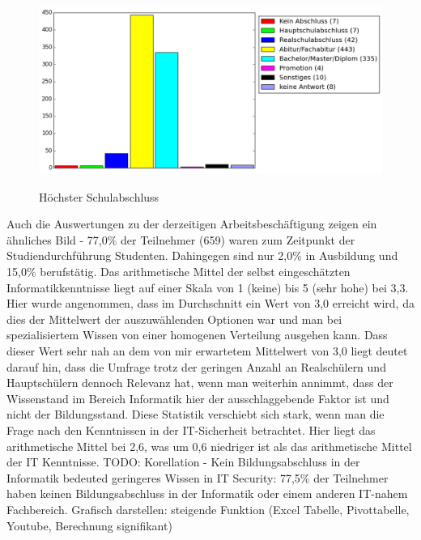 \begin{figure}[H]
\centering
\includegraphics[scale=0.55]{images/schulabschluss}\\
\caption{Höchster Schulabschluss}\label{schulabschluss}
\end{figure}
Auch die Auswertungen zu der derzeitigen Arbeitsbeschäftigung zeigen ein ähnliches Bild - 77,0\% der Teilnehmer (659) waren zum Zeitpunkt der Studiendurchführung Studenten. Dahingegen sind nur 2,0\% in Ausbildung und 15,0\% berufstätig.
Das arithmetische Mittel der selbst eingeschätzten Informatikkenntnisse liegt auf einer Skala von 1 (keine) bis 5 (sehr hohe) bei 3,3. Hier wurde angenommen, dass im Durchschnitt ein Wert von 3,0 erreicht wird, da dies der Mittelwert der auszuwählenden Optionen war und man bei spezialisiertem Wissen von einer homogenen Verteilung ausgehen kann. Dass dieser Wert sehr nah an dem von mir erwartetem Mittelwert von 3,0 liegt deutet darauf hin, dass die Umfrage trotz der geringen Anzahl an Realschülern und Hauptschülern dennoch Relevanz hat, wenn man weiterhin annimmt, dass der Wissenstand im Bereich Informatik hier der ausschlaggebende Faktor ist und nicht der Bildungsstand.
Diese Statistik verschiebt sich stark, wenn man die Frage nach den Kenntnissen in der IT-Sicherheit betrachtet. Hier liegt das arithmetische Mittel bei 2,6, was um 0,6 niedriger ist als das arithmetische Mittel der IT Kenntnisse. 
TODO: Korellation - Kein Bildungsabschluss in der Informatik bedeuted geringeres Wissen in IT Security: 77,5\% der Teilnehmer haben keinen Bildungsabschluss in der Informatik oder einem anderen IT-nahem Fachbereich.
Grafisch darstellen: steigende Funktion (Excel Tabelle, Pivottabelle, Youtube, Berechnung signifikant)

